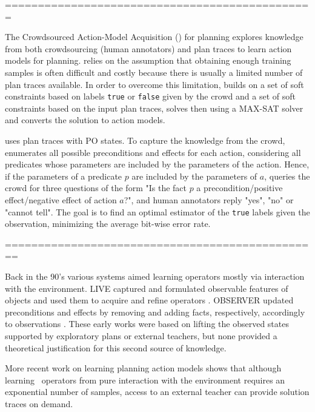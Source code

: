 ===============================================


The Crowdsourced Action-Model Acquisition (\CAMA) for planning explores knowledge from both crowdsourcing (human annotators) and plan traces to learn action models for planning. \CAMA relies on the assumption that obtaining enough training samples is often difficult and costly because there is usually a limited number of plan traces available. In order to overcome this limitation, \CAMA builds on a set of soft constraints based on labels \texttt{true} or \texttt{false} given by the crowd and a set of soft constraints based on the input plan traces, solves then using a MAX-SAT solver and converts the solution to action models.

\CAMA uses plan traces with PO states. To capture the knowledge from the crowd, \CAMA enumerates all possible preconditions and effects for each action, considering all predicates whose parameters are included by the parameters of the action. Hence, if the parameters of a predicate $p$ are included by the parameters of $a$, \CAMA queries the crowd for three questions of the form "Is the fact $p$ a precondition/positive effect/negative effect of action $a$?", and human annotators reply "yes", "no" or "cannot tell". The goal is to find an optimal estimator of the \texttt{true} labels given the observation, minimizing the average bit-wise error rate.





================================================

Back in the 90's various systems aimed learning operators mostly via interaction with the environment. {\sc LIVE} captured and formulated observable features of objects and used them to acquire and refine operators \cite{ShenS89}. {\sc OBSERVER} updated preconditions and effects by removing and adding facts, respectively, accordingly to observations \cite{Wang95learningby}. These early works were based on lifting the observed states supported by exploratory plans or external teachers, but none provided a theoretical justification for this second source of knowledge.

More recent work on learning planning action models \cite{WalshL08} shows that although learning \strips\ operators from pure interaction with the environment requires an exponential number of samples, access to an external teacher can provide solution traces on demand.

